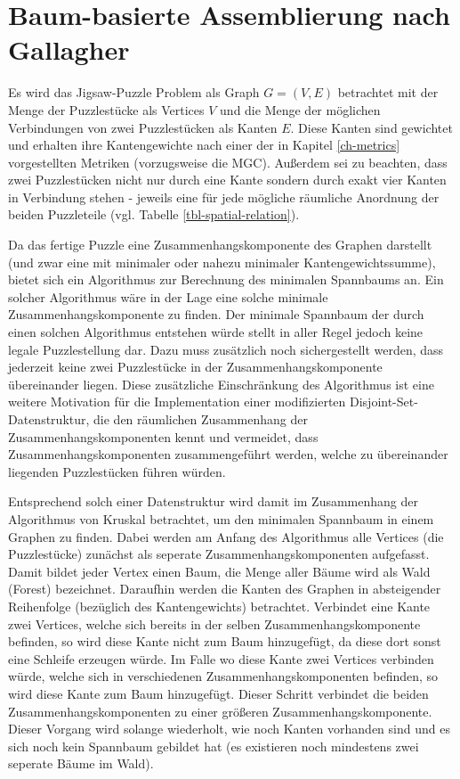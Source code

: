\documentclass{whswinvcbook}
\begin{document}
\section{Baum-basierte Assemblierung nach Gallagher}
Es wird das Jigsaw-Puzzle Problem als Graph $G=(V,E)$ betrachtet mit der Menge der Puzzlestücke als Vertices $V$ und die Menge der möglichen Verbindungen von zwei Puzzlestücken als Kanten $E$. Diese Kanten sind gewichtet und erhalten ihre Kantengewichte nach einer der in Kapitel \ref{ch-metrics} vorgestellten Metriken (vorzugsweise die MGC). Außerdem sei zu beachten, dass zwei Puzzlestücken nicht nur durch eine Kante sondern durch exakt vier Kanten in Verbindung stehen - jeweils eine für jede mögliche räumliche Anordnung der beiden Puzzleteile (vgl. Tabelle \ref{tbl-spatial-relation}).

Da das fertige Puzzle eine Zusammenhangskomponente des Graphen darstellt (und zwar eine mit minimaler oder nahezu minimaler Kantengewichtssumme), bietet sich ein Algorithmus zur Berechnung des minimalen Spannbaums an. Ein solcher Algorithmus wäre in der Lage eine solche minimale Zusammenhangskomponente zu finden. Der minimale Spannbaum der durch einen solchen Algorithmus entstehen würde stellt in aller Regel jedoch keine legale Puzzlestellung dar. Dazu muss zusätzlich noch sichergestellt werden, dass jederzeit keine zwei Puzzlestücke in der Zusammenhangskomponente übereinander liegen. Diese zusätzliche Einschränkung des Algorithmus ist eine weitere Motivation für die Implementation einer modifizierten Disjoint-Set-Datenstruktur, die den räumlichen Zusammenhang der Zusammenhangskomponenten kennt und vermeidet, dass Zusammenhangskomponenten zusammengeführt werden, welche zu übereinander liegenden Puzzlestücken führen würden.

Entsprechend solch einer Datenstruktur wird damit im Zusammenhang der Algorithmus von Kruskal \cite{kruskal} betrachtet, um den minimalen Spannbaum in einem Graphen zu finden. Dabei werden am Anfang des Algorithmus alle Vertices (die Puzzlestücke) zunächst als seperate Zusammenhangskomponenten aufgefasst. Damit bildet jeder Vertex einen Baum, die Menge aller Bäume wird als Wald (Forest) bezeichnet. Daraufhin werden die Kanten des Graphen in absteigender Reihenfolge (bezüglich des Kantengewichts) betrachtet. Verbindet eine Kante zwei Vertices, welche sich bereits in der selben Zusammenhangskomponente befinden, so wird diese Kante nicht zum Baum hinzugefügt, da diese dort sonst eine Schleife erzeugen würde. Im Falle wo diese Kante zwei Vertices verbinden würde, welche sich in verschiedenen Zusammenhangskomponenten befinden, so wird diese Kante zum Baum hinzugefügt. Dieser Schritt verbindet die beiden Zusammenhangskomponenten zu einer größeren Zusammenhangskomponente. Dieser Vorgang wird solange wiederholt, wie noch Kanten vorhanden sind und es sich noch kein Spannbaum gebildet hat (es existieren noch mindestens zwei seperate Bäume im Wald).
\end{document}
